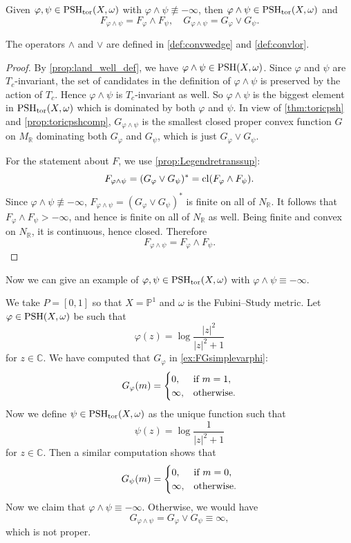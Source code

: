 \begin{proposition}\label{prop:toricrooftop}
    Given $\varphi,\psi\in \mathrm{PSH}_{\mathrm{tor}}(X,\omega)$ with $\varphi\land \psi\not\equiv -\infty$, then $\varphi\land \psi\in \mathrm{PSH}_{\mathrm{tor}}(X,\omega)$ and
    \[
    F_{\varphi\land \psi}=F_{\varphi}\land F_{\psi},\quad G_{\varphi\land \psi}=G_{\varphi}\lor G_{\psi}.
    \]
\end{proposition}
The operators $\land$ and $\lor$ are defined in \cref{def:convwedge} and \cref{def:convlor}.
\begin{proof}
By \cref{prop:land_well_def}, we have $\varphi\land \psi\in \mathrm{PSH}(X,\omega)$. Since $\varphi$ and $\psi$ are $T_c$-invariant, the set of candidates in the definition of $\varphi\land\psi$ is preserved by the action of $T_c$. Hence $\varphi\land\psi$ is $T_c$-invariant as well.
So $\varphi\land \psi$ is the biggest element in $\mathrm{PSH}_{\mathrm{tor}}(X,\omega)$ which is dominated by both $\varphi$ and $\psi$. In view of \cref{thm:toricpsh} and \cref{prop:toricpshcomp}, $G_{\varphi\land \psi}$ is the smallest closed proper convex function $G$ on $M_{\mathbb{R}}$ dominating both $G_{\varphi}$ and $G_{\psi}$, which is just $G_{\varphi}\lor G_{\psi}$.

For the statement about $F$, we use \cref{prop:Legendretranssup}:
\[
    F_{\varphi\land\psi}=(G_\varphi\lor G_\psi)^*=\operatorname{cl}(F_\varphi\land F_\psi).
\]
Since $\varphi\land\psi\not\equiv-\infty$, $F_{\varphi\land\psi}=(G_\varphi\lor G_\psi)^*$ is finite on all of $N_{\mathbb R}$. It follows that $F_\varphi\land F_\psi>-\infty$, and hence is finite on all of $N_{\mathbb R}$ as well. Being finite and convex on $N_{\mathbb R}$, it is continuous, hence closed. Therefore
\[
    F_{\varphi\land\psi}=F_\varphi\land F_\psi.
\]
\end{proof}

\begin{example}\label{ex:landminfty}
    Now we can give an example of $\varphi,\psi\in \mathrm{PSH}_{\mathrm{tor}}(X,\omega)$ with $\varphi\land \psi\equiv -\infty$.

    We take $P=[0,1]$ so that $X=\mathbb{P}^1$ and $\omega$ is the Fubini--Study metric. Let $\varphi\in \mathrm{PSH}(X,\omega)$ be such that
    \[
    \varphi(z)=\log \frac{|z|^2}{|z|^2+1}
    \]
    for $z\in \mathbb{C}$. We have computed that $G_{\varphi}$ in \cref{ex:FGsimplevarphi}:
    \[
    G_{\varphi}(m)=
    \begin{cases}
        0,&\textup{if } m=1,\\
        \infty,&\textup{otherwise}.
    \end{cases}
    \]
    Now we define $\psi\in \mathrm{PSH}_{\mathrm{tor}}(X,\omega)$ as the unique function such that
    \[
    \psi(z)=\log \frac{1}{|z|^2+1}
    \]
    for $z\in \mathbb{C}$. Then a similar computation shows that
    \[
    G_{\psi}(m)=
    \begin{cases}
        0,&\textup{if } m=0,\\
        \infty,&\textup{otherwise}.
    \end{cases}
    \]
    Now we claim that $\varphi\land \psi\equiv -\infty$. Otherwise, we would have
    \[
    G_{\varphi\land \psi}=G_{\varphi}\lor G_{\psi}\equiv\infty,
    \]
    which is not proper.
\end{example}

